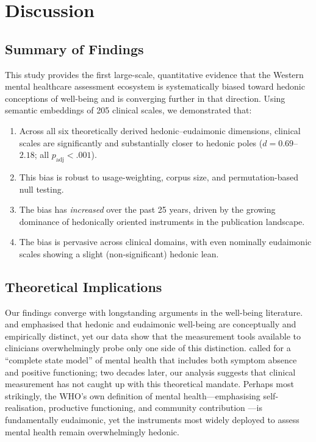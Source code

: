 \documentclass[12pt,a4paper]{article}
\begin{document}
\section{Discussion}\label{sec:discussion}

\subsection{Summary of Findings}

This study provides the first large-scale, quantitative evidence that the Western mental healthcare assessment ecosystem is systematically biased toward hedonic conceptions of well-being and is converging further in that direction.
Using semantic embeddings of 205 clinical scales, we demonstrated that:
\begin{enumerate}
    \item Across all six theoretically derived hedonic--eudaimonic dimensions, clinical scales are significantly and substantially closer to hedonic poles ($d = 0.69$--$2.18$; all $p_{\text{adj}} < .001$).
    \item This bias is robust to usage-weighting, corpus size, and permutation-based null testing.
    \item The bias has \textit{increased} over the past 25 years, driven by the growing dominance of hedonically oriented instruments in the publication landscape.
    \item The bias is pervasive across clinical domains, with even nominally eudaimonic scales showing a slight (non-significant) hedonic lean.
\end{enumerate}

\subsection{Theoretical Implications}

Our findings converge with longstanding arguments in the well-being literature.
\citet{ryan2001happiness} and \citet{deci2000self} emphasised that hedonic and eudaimonic well-being are conceptually and empirically distinct, yet our data show that the measurement tools available to clinicians overwhelmingly probe only one side of this distinction.
\citet{keyes2002mental} called for a ``complete state model'' of mental health that includes both symptom absence and positive functioning; two decades later, our analysis suggests that clinical measurement has not caught up with this theoretical mandate.
Perhaps most strikingly, the WHO's own definition of mental health---emphasising self-realisation, productive functioning, and community contribution \citep{who2004mental}---is fundamentally eudaimonic, yet the instruments most widely deployed to assess mental health remain overwhelmingly hedonic.
\end{document}
